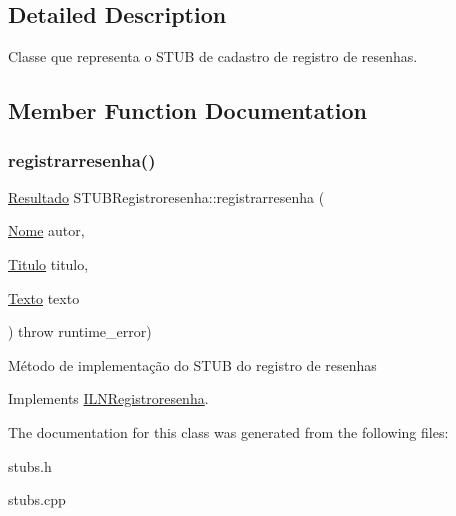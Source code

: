 \subsection{Detailed Description}
Classe que representa o S\+T\+UB de cadastro de registro de resenhas. 

\subsection{Member Function Documentation}
\mbox{\label{classSTUBRegistroresenha_aeb9e6c0471d7eb40cec96d948ede0b3b}} 
\subsubsection{\texorpdfstring{registrarresenha()}{registrarresenha()}}
{\footnotesize\ttfamily \hyperlink{classResultado}{Resultado} S\+T\+U\+B\+Registroresenha\+::registrarresenha (\begin{DoxyParamCaption}\item[{\hyperlink{classNome}{Nome}}]{autor,  }\item[{\hyperlink{classTitulo}{Titulo}}]{titulo,  }\item[{\hyperlink{classTexto}{Texto}}]{texto }\end{DoxyParamCaption}) throw  runtime\+\_\+error) \hspace{0.3cm}{\ttfamily [virtual]}}

Método de implementação do S\+T\+UB do registro de resenhas 

Implements \hyperlink{classILNRegistroresenha}{I\+L\+N\+Registroresenha}.



The documentation for this class was generated from the following files\+:\begin{DoxyCompactItemize}
\item 
stubs.\+h\item 
stubs.\+cpp\end{DoxyCompactItemize}
